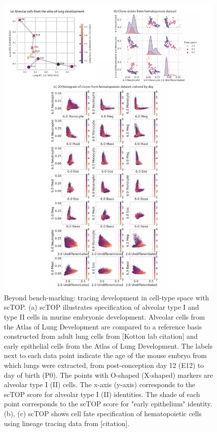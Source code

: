 \documentclass[aps,superscriptaddress, notitlepage,longbibliography]{revtex4-1}
\begin{document}
\begin{figure}
	\centering
		\includegraphics[scale=0.8]{figs/fig4.pdf}
	\caption{Beyond bench-marking: tracing development in cell-type space with scTOP. (a) scTOP illustrates specification of alveolar type I and type II cells in murine embryonic development. Alveolar cells from the Atlas of Lung Development are compared to a reference basis constructed from adult lung cells from [Kotton lab citation] and early epithelial cells from the Atlas of Lung Development. The labels next to each data point indicate the age of the mouse embryo from which lungs were extracted, from post-conception day 12 (E12) to day of birth (P0). The points with O-shaped (X-shaped) markers are alveolar type I (II) cells. The x-axis (y-axis) corresponds to the scTOP score for alveolar type I (II) identities. The shade of each point corresponds to the scTOP score for "early epithelium" identity. (b), (c) scTOP shows cell fate specification of hematopoietic cells using lineage tracing data from [citation]. }
	\label{FIG:4}
\end{figure}
\end{document}
